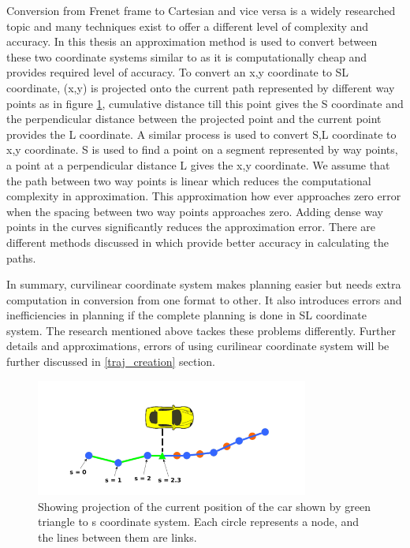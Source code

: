 Conversion from Frenet frame to Cartesian and vice versa is a widely researched topic and many techniques exist to offer a different level of complexity and accuracy. In this thesis an approximation method is used to convert between these two coordinate systems similar to \cite{volvo_reactive_traj} as it is computationally cheap and provides required level of accuracy. To convert an x,y coordinate to SL coordinate, (x,y) is projected onto the current path represented by different way points as in figure \ref{xy_sl_conversion}, cumulative distance till this point gives the S coordinate and the perpendicular distance between the projected point and the current point provides the L coordinate. A similar process is used to convert S,L coordinate to x,y coordinate. S is used to find a point on a segment represented by way points, a point at a perpendicular distance L gives the x,y coordinate. We assume that the path between two way points is linear which reduces the computational complexity in approximation. This approximation how ever approaches zero error when the spacing between two way points approaches zero. Adding dense way points in the curves significantly reduces the approximation error. There are different methods discussed in \cite{lengthparameterized} \cite{Wangrobustand} which provide better accuracy in calculating the paths. 
 
 In summary, curvilinear coordinate system makes planning easier but needs extra computation in conversion from one format to other. It also introduces errors and inefficiencies in planning if the complete planning is done in SL coordinate system. The research mentioned above tackes these problems differently. Further details and approximations, errors of using curilinear coordinate system will be further discussed in \ref{traj_creation} section. 
 
 \begin{figure}[H]
    \centering
    \includegraphics[width=0.8\textwidth]{Images/xy_sl_conversion.png}
    \caption{Showing projection of the current position of the car shown by green triangle to s coordinate system. Each circle represents a node, and the lines between them are links.}
    \label{xy_sl_conversion}
\end{figure}
 
